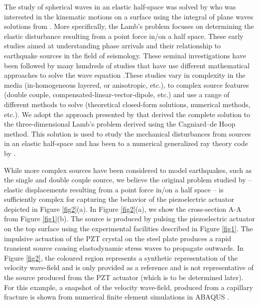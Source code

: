 \documentclass[preprint,3p, 11pt,authoryear]{elsarticle}
\begin{document}
The study of spherical waves in an elastic half-space was solved by \citet{Lamb1904} who was interested in the kinematic motions on a surface using the integral of plane waves solutions from \citet{Rayleigh1885}. More specifically, the Lamb's problem focuses on determining the elastic disturbance resulting from a point force in/on a half space. These early studies aimed at understanding phase arrivals and their relationship to earthquake sources in the field of seismology. These seminal investigations have been followed by many hundreds of studies that have use different mathematical approaches to solve the wave equation \citep[e.g. ch 6 in][]{Aki2002}.These studies vary in complexity in the media (in-homogeneous layered, or anisotropic, etc.), to complex source features (double couple, compensated-linear-vector-dipole, etc.) and use a range of different methods to solve (theoretical closed-form solutions, numerical methods, etc.). We adopt the approach presented by \citet{Johnson1974} that derived the complete solution to the three-dimensional Lamb’s problem derived using the Cagniard--de Hoop method. This solution is used to study the mechanical disturbances from sources in an elastic half-space and has been to a numerical generalized ray theory code by \citet{Hsu1985} \citep[see also][]{McLaskey2011, McLaskey2012, Selvadurai2019}.

While more complex sources have been considered to model earthquakes, such as the single and double couple source, we believe the original problem studied by \citet{Lamb1904} -- elastic displacements resulting from a point force in/on a half space -- is sufficiently complex for capturing the behavior of the piezoelectric actuator depicted in Figure \ref{fig2}(a). In Figure \ref{fig2}(a), we show the cross-section A-A from Figure \ref{fig1}(b). The source is produced by pulsing the piezoelectric actuator on the top surface using the experimental facilities described in Figure \ref{fig1}. The impulsive actuation of the PZT crystal on the steel plate produces a rapid transient source causing elastodynamic stress waves to propagate outwards. In Figure \ref{fig2}, the coloured region represents a synthetic representation of the velocity wave-field and is only provided as a reference and is not representative of the source produced from the PZT actuator (which is to be determined later). For this example, a snapshot of the velocity wave-field, produced from a capillary fracture is shown from numerical finite element simulations in ABAQUS \citep[adapted from fig. 2][]{Selvadurai2019}. 
\end{document}
